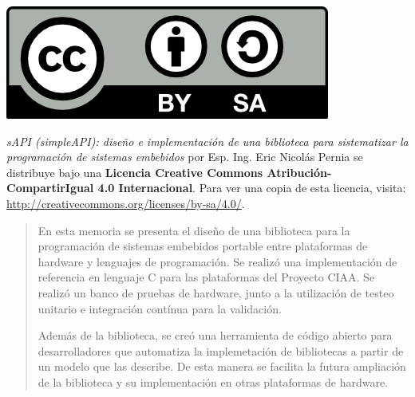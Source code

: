 \documentclass[
11pt, %
spanish,
singlespacing, %
parskip, %
headsepline, %
]{MastersDoctoralThesis} %
\begin{document}
\newpage
\begin{center}

\begin{mdframed}[outerlinecolor=black, outerlinewidth=2pt, linecolor=gray, middlelinewidth=3pt, roundcorner=10pt]

 \begin{center}
  \includegraphics*{Figures/cc-by-sa.png}
 \end{center}

\emph{sAPI (simpleAPI): diseño e implementación de una biblioteca para
sistematizar la programación de sistemas embebidos} por Esp. Ing. Eric Nicolás
Pernia se distribuye bajo una \textbf{Licencia Creative Commons
Atribución-CompartirIgual 4.0 Internacional}.
Para ver una copia de esta licencia, visita:
\\
\url{http://creativecommons.org/licenses/by-sa/4.0/}.


\end{mdframed}

\end{center}


\begin{abstract}
\addchaptertocentry{\abstractname} %
%
\centering

En esta memoria se presenta el diseño de una biblioteca para la programación de
sistemas embebidos portable entre plataformas de hardware y lenguajes de
programación. Se realizó una implementación de referencia en lenguaje C para
las plataformas del Proyecto CIAA. Se realizó un banco de pruebas de hardware,
junto a la utilización de testeo unitario e integración contínua para la
validación.

Además de la biblioteca, se creó una herramienta de código abierto para
desarrolladores que automatiza la implemetación de bibliotecas a partir de un
modelo que las describe. De esta manera se facilita la futura ampliación de la
biblioteca y su implementación en otras plataformas de hardware.

\end{abstract}
\end{document}
